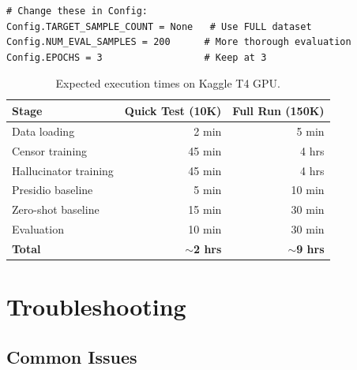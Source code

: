 \documentclass[11pt, a4paper]{article}
\begin{document}
\begin{lstlisting}[style=python]
# Change these in Config:
Config.TARGET_SAMPLE_COUNT = None   # Use FULL dataset
Config.NUM_EVAL_SAMPLES = 200      # More thorough evaluation
Config.EPOCHS = 3                  # Keep at 3
\end{lstlisting}

\begin{table}[h]
\centering
\begin{tabular}{lrr}
\toprule
\textbf{Stage} & \textbf{Quick Test (10K)} & \textbf{Full Run (150K)} \\
\midrule
Data loading & 2 min & 5 min \\
Censor training & 45 min & 4 hrs \\
Hallucinator training & 45 min & 4 hrs \\
Presidio baseline & 5 min & 10 min \\
Zero-shot baseline & 15 min & 30 min \\
Evaluation & 10 min & 30 min \\
\midrule
\textbf{Total} & \textbf{$\sim$2 hrs} & \textbf{$\sim$9 hrs} \\
\bottomrule
\end{tabular}
\caption{Expected execution times on Kaggle T4 GPU.}
\end{table}

\section{Troubleshooting}

\subsection{Common Issues}
\end{document}
